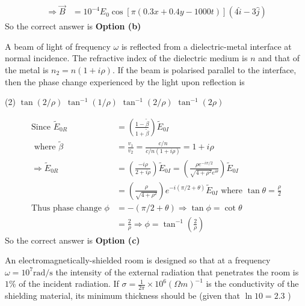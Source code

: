 \begin{enumerate}
\begin{answer}
\begin{align*}
	\Rightarrow \vec{B}&=10^{-4} E_{0} \cos [\pi(0.3 x+0.4 y-1000 t)](4 \hat{i}-3 \hat{j})
	\end{align*}
	So the correct answer is \textbf{Option (b)}
\end{answer}
	\begin{minipage}{\textwidth}
		\item A beam of light of frequency $\omega$ is reflected from a dielectric-metal interface at normal incidence. The refractive index of the dielectric medium is $n$ and that of the metal is $n_{2}=n(1+i \rho)$. If the beam is polarised parallel to the interface, then the phase change experienced by the light upon reflection is
	\end{minipage}
	\begin{tasks}(2)
		\task[\textbf{a.}] $\tan (2 / \rho)$ 
		\task[\textbf{b.}]$\tan ^{-1}(1 / \rho)$
		\task[\textbf{c.}]$\tan ^{-1}(2 / \rho)$
		\task[\textbf{d.}]$\tan ^{-1}(2 \rho)$
	\end{tasks}
\begin{answer}
	\begin{align*}
	\text{Since }\tilde{E}_{0 R}&=\left(\frac{1-\tilde{\beta}}{1+\tilde{\beta}}\right) \tilde{E}_{0 I} \\\text{ where }\tilde{\beta}&=\frac{v_{1}}{v_{2}}=\frac{c / n}{c / n(1+i \rho)}=1+i \rho\\
	\Rightarrow \tilde{E}_{0 R}&=\left(\frac{-i \rho}{2+i \rho}\right) \tilde{E}_{0 I}=\left(\frac{\rho e^{-i \pi / 2}}{\sqrt{4+\rho^{2}} e^{i \theta}}\right) \tilde{E}_{0 I}\\&=\left(\frac{\rho}{\sqrt{4+\rho^{2}}}\right) e^{-i(\pi / 2+\theta)} \tilde{E}_{0 I}\text{ where }\tan \theta=\frac{\rho}{2}\\
	\text{Thus phase change }\phi&=-(\pi / 2+\theta) \Rightarrow \tan \phi=\cot \theta\\&=\frac{2}{\rho} \Rightarrow \phi=\tan ^{-1}\left(\frac{2}{\rho}\right)
	\end{align*}
	So the correct answer is \textbf{Option (c)}
\end{answer}
	\begin{minipage}{\textwidth}
		\item An electromagnetically-shielded room is designed so that at a frequency $\omega=10^{7} \mathrm{rad} / \mathrm{s}$ the intensity of the external radiation that penetrates the room is $1 \%$ of the incident radiation. If $\sigma=\frac{1}{2 \pi} \times 10^{6}(\Omega m)^{-1}$ is the conductivity of the shielding material, its minimum thickness should be (given that $\ln 10=2.3$ )

\end{minipage}
\end{enumerate}
